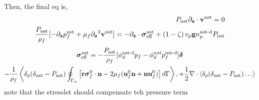 Then, the final eq is, 
\begin{align}
    P_\text{nst} \pddz \cdot  \textbf{v}^\text{nst} = 0 \\
    \frac{P_\text{nst}}{\rho_f}[
        - \pddz p_f^\text{nst}
        + \mu_f \pddz^2 \textbf{v}^\text{nst}
    ]
    = 
    -\pddz\cdot \bm\sigma_\text{eff}^\text{nst}
    + \left(1-\zeta\right)  v_p \textbf{g} n_p^\text{nst-d} P_\text{nst}
    \label{eq:NS_dilute_inertiel}
\end{align}
\begin{multline*}
    \bm\sigma^\text{nst}_\text{eff}
    =
    - \frac{P_\text{nst}}{\rho_f } [\phi_d^\text{nst-d} p_f
    - \phi_d^{nst} p_f^\text{nst-d}]\bm\delta \\
    - \frac{1}{\rho_f}\left<\delta_{p} (\delta_\text{nst} - P_\text{nst}) \oint_{\Gamma_{\alpha}} \left[
        \textbf{r}\bm{\sigma}_f^0 \cdot \textbf{n}
        -  2 \mu_f (\textbf{u}_f^0 \textbf{n} + \textbf{n} \textbf{u}_f^0)
        \right] 
     d\Gamma\right>,
    + \frac{1}{2}\mathbf{\nabla}\cdot\left<\delta_{p} (\delta_\text{nst} - P_\text{nst} )\ldots\right>
\end{multline*}
note that the stresslet should compensate teh pressure term


